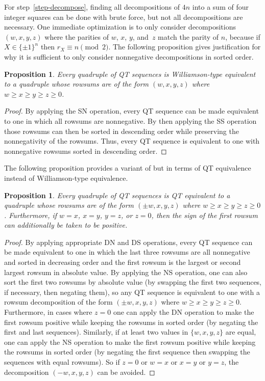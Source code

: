 \documentclass[12pt]{article}
\numberwithin{equation}{section}
\newtheorem{proposition}[theorem]{Proposition}
\begin{document}
For step~\ref{step-decompose}, finding all decompositions of $4n$ into a sum of four integer squares can be done with brute force, but not all decompositions are necessary.
One immediate optimization is to only consider decompositions $(w,x,y,z)$ where the parities of $w$, $x$, $y$, and~$z$ match the parity
of $n$, because if $X\in\{\pm1\}^n$ then $r_X\equiv n\pmod2$.  The following proposition gives justification
for why it is sufficient to only consider nonnegative decompositions in sorted order.
\begin{proposition}\label{prop:wt-rowsums}
Every quadruple of QT sequences is Williamson-type equivalent to a quadruple whose rowsums
are of the form $(w,x,y,z)$ where $w\geq x\geq y\geq z\geq 0$.
\end{proposition}
\begin{proof}
By applying the SN operation, every QT sequence can be made equivalent to one in which all
rowsums are nonnegative.  By then applying the SS operation those rowsums can then be sorted
in descending order while preserving the nonnegativity of the rowsums.  Thus, every QT sequence
is equivalent to one with nonnegative rowsums sorted in descending order.
\end{proof}
The following proposition
provides a variant of  but in terms of QT equivalence
instead of Williamson-type equivalence.
\begin{proposition}\label{prop:rowsum}
Every quadruple of QT sequences is QT equivalent to a quadruple whose rowsums are of the form
$(\pm w,x,y,z)$ where $w\geq x\geq y\geq z\geq 0$.  Furthermore, if $w=x$, $x=y$, $y=z$, or $z=0$, then
the sign of the first rowsum can additionally be taken to be positive.
\end{proposition}
\begin{proof}
By applying appropriate DN and DS operations, every QT sequence can be made equivalent to one in which the last three rowsums are all nonnegative
and sorted in decreasing order and the first rowsum is the largest or second largest rowsum in absolute value.  By applying the NS operation, one can also sort the first two rowsums by absolute value (by swapping the first two sequences, if necessary, then negating them), so any QT sequence is equivalent to one with a rowsum decomposition of the form
$(\pm w,x,y,z)$ where $w\geq x\geq y\geq z\geq 0$.
Furthermore, in cases where $z=0$ one can apply the DN operation to make the first rowsum positive while
keeping the rowsums in sorted order (by negating the first and last sequences).
Similarly, if at least two values in $\{w,x,y,z\}$ are equal, one can apply the NS operation to make the first rowsum positive
while keeping the rowsums in sorted order (by negating the first sequence then swapping the sequences with equal rowsums).
So if $z=0$ or $w=x$ or $x=y$ or $y=z$, the decomposition $(-w,x,y,z)$ can be avoided.
\end{proof}
\end{document}
